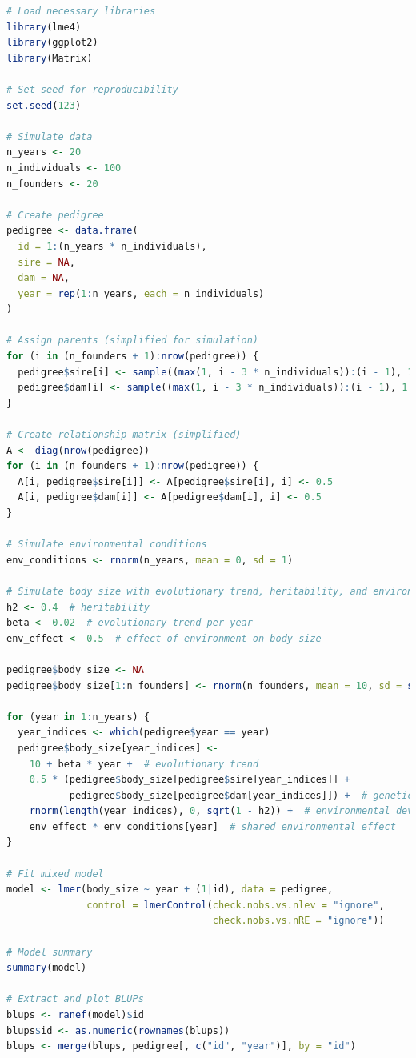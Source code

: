 \documentclass[12pt,a4paper]{article}
\begin{document}
\begin{lstlisting}[language=R]
# Load necessary libraries
library(lme4)
library(ggplot2)
library(Matrix)

# Set seed for reproducibility
set.seed(123)

# Simulate data
n_years <- 20
n_individuals <- 100
n_founders <- 20

# Create pedigree
pedigree <- data.frame(
  id = 1:(n_years * n_individuals),
  sire = NA,
  dam = NA,
  year = rep(1:n_years, each = n_individuals)
)

# Assign parents (simplified for simulation)
for (i in (n_founders + 1):nrow(pedigree)) {
  pedigree$sire[i] <- sample((max(1, i - 3 * n_individuals)):(i - 1), 1)
  pedigree$dam[i] <- sample((max(1, i - 3 * n_individuals)):(i - 1), 1)
}

# Create relationship matrix (simplified)
A <- diag(nrow(pedigree))
for (i in (n_founders + 1):nrow(pedigree)) {
  A[i, pedigree$sire[i]] <- A[pedigree$sire[i], i] <- 0.5
  A[i, pedigree$dam[i]] <- A[pedigree$dam[i], i] <- 0.5
}

# Simulate environmental conditions
env_conditions <- rnorm(n_years, mean = 0, sd = 1)

# Simulate body size with evolutionary trend, heritability, and environmental effect
h2 <- 0.4  # heritability
beta <- 0.02  # evolutionary trend per year
env_effect <- 0.5  # effect of environment on body size

pedigree$body_size <- NA
pedigree$body_size[1:n_founders] <- rnorm(n_founders, mean = 10, sd = sqrt(h2))

for (year in 1:n_years) {
  year_indices <- which(pedigree$year == year)
  pedigree$body_size[year_indices] <- 
    10 + beta * year +  # evolutionary trend
    0.5 * (pedigree$body_size[pedigree$sire[year_indices]] + 
           pedigree$body_size[pedigree$dam[year_indices]]) +  # genetic component
    rnorm(length(year_indices), 0, sqrt(1 - h2)) +  # environmental deviation
    env_effect * env_conditions[year]  # shared environmental effect
}

# Fit mixed model
model <- lmer(body_size ~ year + (1|id), data = pedigree,
              control = lmerControl(check.nobs.vs.nlev = "ignore",
                                    check.nobs.vs.nRE = "ignore"))

# Model summary
summary(model)

# Extract and plot BLUPs
blups <- ranef(model)$id
blups$id <- as.numeric(rownames(blups))
blups <- merge(blups, pedigree[, c("id", "year")], by = "id")


\end{lstlisting}
\end{document}
